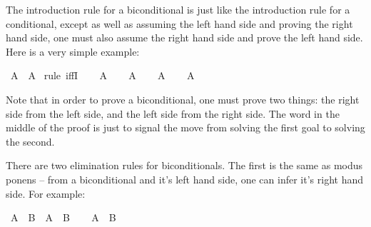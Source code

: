 \begin{isabellebody}
\begin{isamarkuptext}
The introduction rule for a biconditional is just like the introduction rule for a
conditional, except as well as assuming the left hand side and proving the right hand side, one
must also assume the right hand side and prove the left hand side. Here is a very simple example:%
\end{isamarkuptext}\isamarkuptrue%
\isamarkupfalse%
\ {\isachardoublequoteopen}A\ {\isasymlongleftrightarrow}\ A{\isachardoublequoteclose}\isanewline
%
\isadelimproof
%
\endisadelimproof
%
\isatagproof
{}\isamarkupfalse%
\ {\isacharparenleft}rule\ iffI{\isacharparenright}\isanewline
\ \ \isamarkupfalse%
\ {\isachardoublequoteopen}A{\isachardoublequoteclose}\isanewline
\ \ \isamarkupfalse%
\ {\isachardoublequoteopen}A{\isachardoublequoteclose}\isacommand{{\isachardot}}\isamarkupfalse%
\isanewline
{}\isamarkupfalse%
\isanewline
\ \ \isamarkupfalse%
\ {\isachardoublequoteopen}A{\isachardoublequoteclose}\isanewline
\ \ \isamarkupfalse%
\ {\isachardoublequoteopen}A{\isachardoublequoteclose}\isacommand{{\isachardot}}\isamarkupfalse%
\isanewline
{}\isamarkupfalse%
%
\endisatagproof
{\isafoldproof}%
%
\isadelimproof
%
\endisadelimproof
%
\begin{isamarkuptext}%
Note that in order to prove a biconditional, one must prove two things: the right side from 
the left side, and the left side from the right side. The word  in the middle of the
proof is just to signal the move from solving the first goal to solving the second.%
\end{isamarkuptext}\isamarkuptrue%
%
\isamarkuptrue%
%
\begin{isamarkuptext}%
There are two elimination rules for biconditionals. The first is the same as modus ponens --
from a biconditional and it's left hand side, one can infer it's right hand side. For example:%
\end{isamarkuptext}\isamarkuptrue%
\isamarkupfalse%
\ {\isachardoublequoteopen}{\isacharparenleft}A\ {\isasymlongleftrightarrow}\ B{\isacharparenright}\ {\isasymlongrightarrow}\ A\ {\isasymlongrightarrow}\ B{\isachardoublequoteclose}\isanewline
%
\isadelimproof
%
\endisadelimproof
%
\isatagproof
{}\isamarkupfalse%
\isanewline
\ \ \isamarkupfalse%
\ {\isachardoublequoteopen}A\ {\isasymlongleftrightarrow}\ B{\isachardoublequoteclose}\isanewline
\ \ \isamarkupfalse%

\end{isabellebody}
